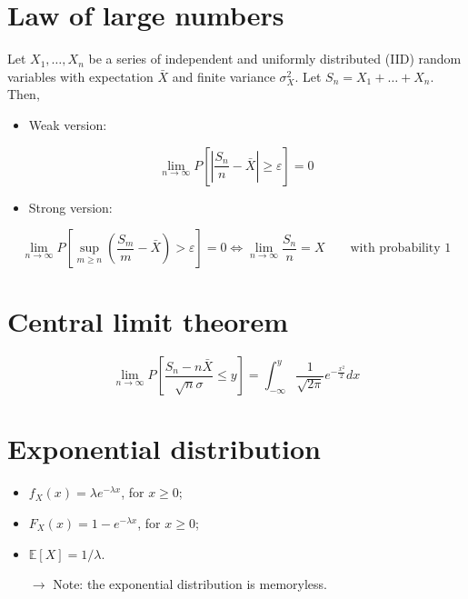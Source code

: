 \documentclass[12pt, openany]{report}
\newcommand{\E}{\mathbb{E}}
\theoremstyle{definition}
\begin{document}
\section{Law of large numbers}
Let $X_1,\dots,X_n$ be a series of independent and uniformly distributed (IID) random variables with expectation $\bar X$ and finite variance $\sigma_X^2$. Let $S_n = X_1+\dots +X_n$. Then, 
\begin{itemize}
  \item Weak version:
\end{itemize}
\begin{equation}
  \lim_{n\to \infty} P\left[|\frac{S_n}{n}-\bar X|\ge \varepsilon\right] = 0
\end{equation}
\begin{itemize}
  \item Strong version:
\end{itemize}
\begin{equation}
  \lim_{n\to \infty} P\left[\sup_{m\ge n}\left(\frac{S_m}{m}-\bar X\right)>\varepsilon\right] = 0\Longleftrightarrow \lim_{n\to \infty}\frac{S_n}{n}=X\qquad \text{with probability 1}
\end{equation}
\section{Central limit theorem}
\begin{equation}
  \lim_{n\to \infty} P\left[\frac{S_n-n\bar X}{\sqrt{n}\sigma}\le y\right] = \int_{-\infty}^y \frac{1}{\sqrt{2\pi}} e^{-\frac{x^2}{2}}dx
\end{equation}
\section{Exponential distribution}
\begin{itemize}
  \item $f_X(x)=\lambda e^{-\lambda x}$, for $x\ge 0$;
  \item $F_X(x)=1-e^{-\lambda x}$, for $x\ge 0$;
  \item $\E[X]=1/\lambda$.
  \item [$\rightarrow$] Note: the exponential distribution is memoryless.
\end{itemize}
\end{document}
